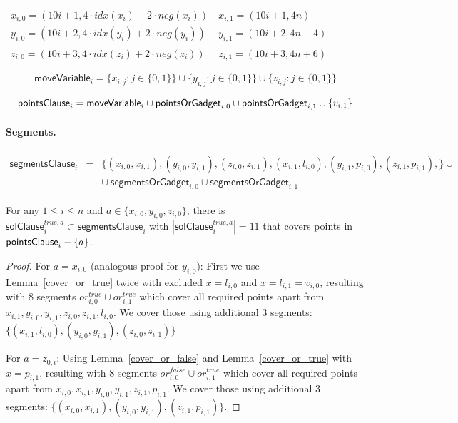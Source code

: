 \begin{center}
\begin{tabular}{ l l }
	$x_{i, 0} = (10i+1, 4\cdot idx(x_i) + 2\cdot neg(x_i))$ &
	$x_{i, 1} = (10i+1, 4n)$ \\
	$y_{i, 0} = (10i+2, 4\cdot idx(y_i) + 2\cdot neg(y_i))$ &
	$y_{i, 1} = (10i+2, 4n + 4)$ \\
	$z_{i, 0} = (10i+3, 4\cdot idx(z_i) + 2\cdot neg(z_i))$ &
	$z_{i, 1} = (10i+3, 4n + 6)$
\end{tabular}
\end{center}

\newcommand{\segmentsClause}{\mathsf{segmentsClause}}	
 
 $$\mathsf{moveVariable}_i = 
 \{x_{i, j} : j \in \{0, 1\}\} \cup
 \{y_{i, j} : j \in \{0, 1\}\} \cup
 \{z_{i, j} : j \in \{0, 1\}\} 
 $$
 
 $$\mathsf{pointsClause}_i = 
 \mathsf{moveVariable}_i \cup \mathsf{pointsOrGadget}_{i, 0}
 \cup \mathsf{pointsOrGadget}_{i, 1} \cup \{v_{i, 1} \} 
 $$

\paragraph{Segments.}

\begin{eqnarray*}
\segmentsClause_i & = & \{ (x_{i, 0}, x_{i, 1}),
(y_{i, 0}, y_{i, 1}),
(z_{i, 0}, z_{i, 1}),
(x_{i, 1}, l_{i, 0}),
(y_{i, 1}, p_{i, 0}),
(z_{i, 1}, p_{i, 1}),
\} \cup \\
& & \cup \ \mathsf{segmentsOrGadget}_{i, 0} \cup \mathsf{segmentsOrGadget}_{i, 1}
\end{eqnarray*}

\newcommand{\segmentsClauseSolTrue}[1]{\mathsf{solClause}^{true,#1}}
\newcommand{\segmentsClauseSolFalse}{\mathsf{solClause}^{false}}

\begin{lemma}
\label{cover_clauses_solution_true}
For any $1 \le i \le n$ and $a \in \{ x_{i, 0}, y_{i, 0}, z_{i, 0}\}$,
there is $\segmentsClauseSolTrue{a}_i \subset \segmentsClause_i$
with $|\segmentsClauseSolTrue{a}_i| = 11$
that covers points in $\mathsf{pointsClause}_i - \{a\}$.
\end{lemma}

\begin{proof}
For $a = x_{i, 0}$ (analogous proof for $y_{i, 0}$):
First we use Lemma~\ref{cover_or_true} twice with excluded $x = l_{i, 0}$ and
$x = l_{i, 1} = v_{i, 0}$,
resulting with 8 segments $or^{true}_{i, 0} \cup or^{true}_{i, 1}$
which cover all required points apart from
$x_{i, 1}, y_{i, 0}, y_{i, 1}, z_{i, 0}, z_{i, 1}, l_{i, 0}$.
We cover those using additional 3 segments:
$\{ (x_{i, 1}, l_{i, 0}), (y_{i, 0}, y_{i, 1}),
(z_{i, 0}, z_{i, 1}) \}$

For $a = z_{0, i}$:
Using Lemma~\ref{cover_or_false} and Lemma~\ref{cover_or_true} with
$x = p_{i, 1}$,
resulting with 8 segments $or^{false}_{i, 0} \cup or^{true}_{i, 1}$
which cover all required points apart from
$x_{i, 0}, x_{i, 1}, y_{i, 0}, y_{i, 1}, z_{i, 1}, p_{i, 1}$.
We cover those using additional 3 segments:
$\{ (x_{i, 0}, x_{i, 1}), (y_{i, 0}, y_{i, 1}),
(z_{i, 1}, p_{i, 1}) \}$.
\end{proof}

